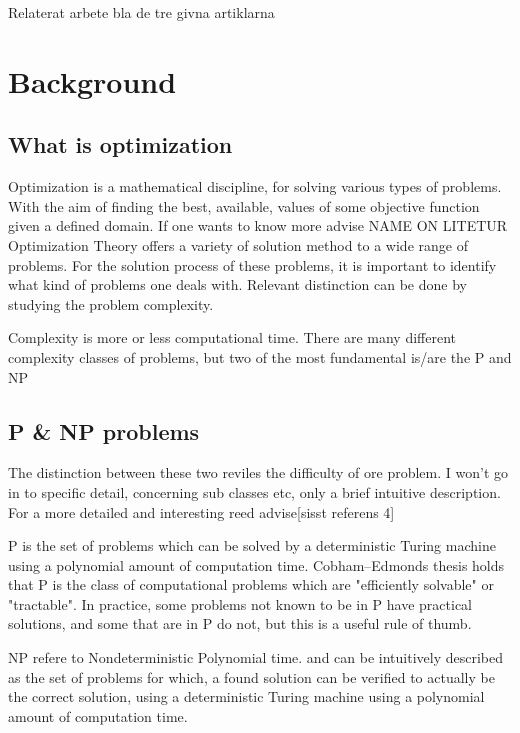 Relaterat arbete bla de tre givna artiklarna 

\section{Background}

\subsection{What is optimization}

Optimization is a mathematical discipline, for solving various types of problems. With the aim of finding the best, available, values of some objective function given a defined domain. If one wants to know more advise NAME ON LITETUR\\

Optimization Theory offers a variety of solution method to a wide range of problems. For the solution process of these problems, it is important to identify what kind of problems one deals with.
Relevant distinction can be done by studying the problem complexity.

Complexity is more or less computational time. There are many different complexity classes of problems, but two of the most fundamental is/are the P and NP

\subsection{P \& NP problems}

The distinction between these two reviles the difficulty of ore problem. I won’t go in to specific detail, concerning sub classes etc, only a brief intuitive description.
For a more detailed and interesting reed advise[sisst referens 4]

P is the set of problems which can be solved by a deterministic Turing machine using a polynomial amount of computation time.
Cobham–Edmonds thesis holds that P is the class of computational problems which are "efficiently solvable" or "tractable". In practice, some problems not known to be in P have practical solutions, and some that are in P do not, but this is a useful rule of thumb.

NP refere to Nondeterministic Polynomial time. and can be intuitively described as the set of problems for which, a found solution can be verified to actually be the correct solution, using a deterministic Turing machine using a polynomial amount of computation time.

